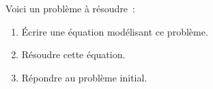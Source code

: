 \documentclass[exercice]{thedocument}%
\begin{document}
%
Voici un problème à résoudre~:
\par\medskip{}
\begin{enumerate}
    \item Écrire une équation modélisant ce problème.
    \item Résoudre cette équation.
    \item Répondre au problème initial.
\end{enumerate}
\end{document}
